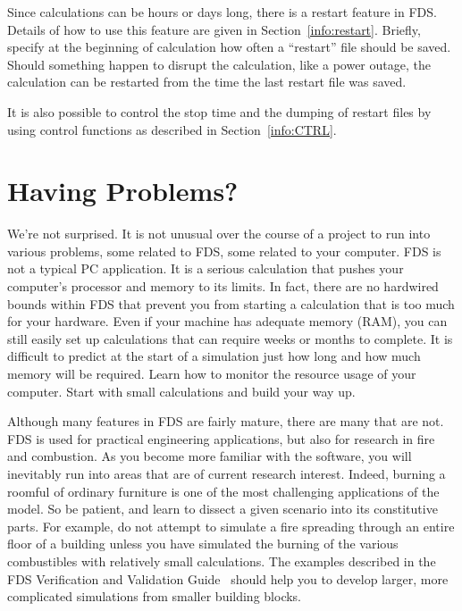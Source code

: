 \documentclass[11pt]{book}
\begin{document}
Since calculations can be hours or days long, there is a restart
feature in FDS. Details of how to use this feature
are given in Section~\ref{info:restart}. Briefly, specify at the
beginning of calculation how often a ``restart'' file should be saved.
Should something happen to disrupt the calculation, like a power
outage, the calculation can be restarted from the time the last restart
file was saved.

It is also possible to control the stop time and the dumping of restart files by using
control functions as described in Section~\ref{info:CTRL}.



\section{Having Problems?}

We're not surprised.  It is not unusual over the course of a
project to run into various problems, some related to FDS, some related to your computer. FDS is not a typical PC application. It is a serious
calculation that pushes your computer's processor and memory to its limits. In fact, there are no hardwired bounds within FDS  that
prevent you from starting a calculation that is too much for your hardware.
Even if your machine has adequate memory (RAM), you can still easily set up calculations that can require
weeks or months to complete. It is difficult to predict at the start of a simulation just how long and how much memory will be required. Learn
how to monitor the resource usage of your computer. Start with small calculations and build your way up.

Although many features in FDS are fairly mature, there are many that are not. FDS is used for practical engineering applications, but also for
research in fire and combustion. As you become more familiar with the software, you will inevitably run into areas that are of current research
interest. Indeed, burning a roomful of ordinary furniture is one of the most challenging applications of the model. So be patient, and learn to
dissect a given scenario into its constitutive parts. For example, do not attempt to simulate a fire spreading through an entire floor of a
building unless you have simulated the burning of the various combustibles with relatively small calculations. The examples described in the
FDS Verification and Validation Guide~\cite{FDS_VV_Guide_5} should help you to develop larger, more complicated simulations from smaller building blocks.
\end{document}
